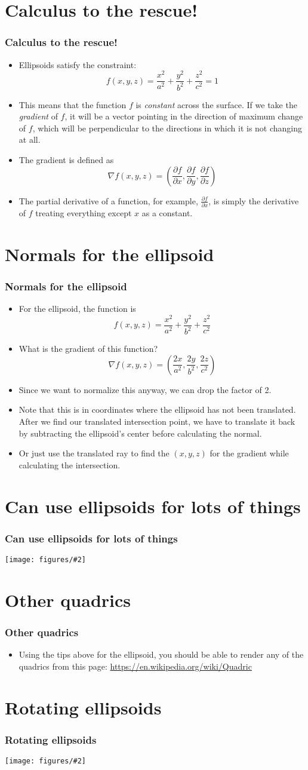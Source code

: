 \documentclass[slidestop,xcolor=pst]{beamer}
\newcommand{\mygraphc}[2]{\centerline{\texttt{[image: figures/\#2]}}}
\newcommand{\sect}[1]{
\section{#1}
\begin{frame}[fragile]\frametitle{#1}
}
\newcommand{\bi}{\begin{itemize}}
\newcommand{\ei}{\end{itemize}}
\begin{document}
\sect{Calculus to the rescue!}
\bi
\item
Ellipsoids satisfy the constraint:
\[
f(x,y,z) = \frac{x^2}{a^2} + \frac{y^2}{b^2} + \frac{z^2}{c^2} = 1
\]
\item
This means that the function $f$ is {\em constant} across the
surface.  If we take the {\em gradient} of $f$, it will be a vector pointing
in the direction of maximum change of $f$, which will be perpendicular
to the directions in which it is not changing at all.
\item
  The gradient is defined as
\[
\nabla f(x,y,z) = \left(
\frac{\partial f}{\partial x} ,
\frac{\partial f}{\partial y} ,
\frac{\partial f}{\partial z}
\right)
\]
\item
The partial derivative of a function, for example, $\frac{\partial
  f}{\partial x}$, is simply the derivative of $f$ treating everything
except $x$ as a constant.
\ei
\end{frame}

\sect{Normals for the ellipsoid}
\bi
\item For the ellipsoid, the function is
\[
f(x,y,z) = \frac{x^2}{a^2} + \frac{y^2}{b^2} + \frac{z^2}{c^2}
\]
\item What is the gradient of this function? \pause
\[
\nabla f(x,y,z) = \left(\frac{2x}{a^2} , \frac{2y}{b^2} , \frac{2z}{c^2}\right)
\]
\item Since we want to normalize this anyway, we can drop the factor of 2.
\item
Note that this is in coordinates where the ellipsoid has not been
translated.  After we find our translated intersection point, we have
to translate it back by subtracting the ellipsoid's center before
calculating the normal.
\item Or just use the translated ray to find the $(x,y,z)$ for the
  gradient while calculating the intersection.  
\ei
\end{frame}

\sect{Can use ellipsoids for lots of things}
\mygraphc{0.7}{axesworld.png}
\end{frame}

\sect{Other quadrics}
\bi
\item Using the tips above for the ellipsoid, you should be able to
  render any of the quadrics from this page:
  \url{https://en.wikipedia.org/wiki/Quadric}
  \ei
\end{frame}

\sect{Rotating ellipsoids}
\mygraphc{0.7}{ellipsoidworld.png}
\end{frame}
\end{document}
